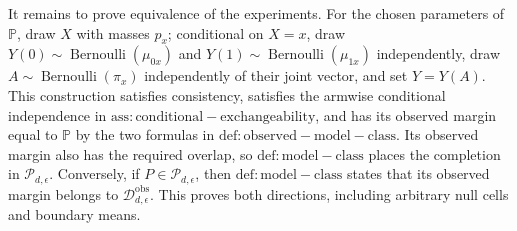 It remains to prove equivalence of the experiments.  For the chosen parameters of \(\mathbb P\), draw \(X\) with masses \(p_x\); conditional on \(X=x\), draw \(Y(0)\sim\operatorname{Bernoulli}(\mu_{0x})\) and \(Y(1)\sim\operatorname{Bernoulli}(\mu_{1x})\) independently, draw \(A\sim\operatorname{Bernoulli}(\pi_x)\) independently of their joint vector, and set \(Y=Y(A)\).  This construction satisfies consistency, satisfies the armwise conditional independence in \(\mathrm{ass:conditional-exchangeability}\), and has its observed margin equal to \(\mathbb P\) by the two formulas in \(\mathrm{def:observed-model-class}\).  Its observed margin also has the required overlap, so \(\mathrm{def:model-class}\) places the completion in \(\mathcal P_{d,\epsilon}\).  Conversely, if \(P\in\mathcal P_{d,\epsilon}\), then \(\mathrm{def:model-class}\) states that its observed margin belongs to \(\mathcal D_{d,\epsilon}^{\mathrm{obs}}\).  This proves both directions, including arbitrary null cells and boundary means.